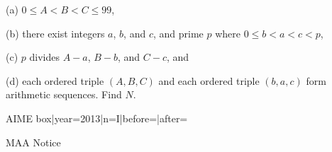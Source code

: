 \documentclass{article}
\begin{document}
\begin{enumerate}[label=\arabic*., itemsep=0.5em]
(a) $0\le A<B<C\le99$, 

(b) there exist integers $a$, $b$, and $c$, and prime $p$ where $0\le b<a<c<p$, 

(c) $p$ divides $A-a$, $B-b$, and $C-c$, and 

(d) each ordered triple $(A,B,C)$ and each ordered triple $(b,a,c)$ form arithmetic sequences. Find $N$.



{{AIME box|year=2013|n=I|before=|after=}}

{{MAA Notice}}\par \vspace{0.5em}\end{enumerate}
\end{document}
